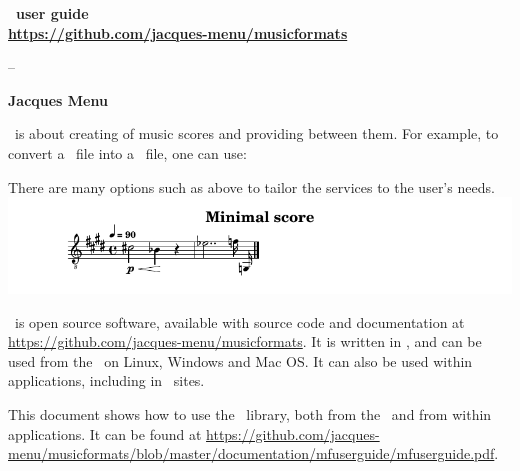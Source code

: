 \documentclass[11pt,a4paper]{report}
\begin{document}
\begin{titlepage}
  \begin{center}
    \vspace*{2cm}

    \textbf{
      \LARGE{\mf\ user guide} \\[10pt]
			\Large{\url{https://github.com/jacques-menu/musicformats}}
		}

    \vspace{0.25cm}

    \large{
			-- %
    	
		}

    \vspace{0.75cm}

    \large{\textbf{Jacques Menu}}
  \end{center}

  \vspace{1cm}


\mf\ is about creating  of music scores and providing  between them. For example, to convert a \mxml\ file into a \lily\ file, one can use:

\begin{center}
\end{center}
There are many options such as  above to tailor the services to the user's needs. \\
\includegraphics[scale=.8]{../mfgraphics/mfgraphicsMinimalScore.png}

\mf\ is open source software, available with source code and documentation at \url{https://github.com/jacques-menu/musicformats}. It is written in \CPlusplus, and can be used from the \CLI\ on Linux, Windows and Mac OS. It can also be used within applications, including in \Web\ sites.

This document shows how to use the \mf\ library, both from the \CLI\ and from within applications.
It can be found at \url{https://github.com/jacques-menu/musicformats/blob/master/documentation/mfuserguide/mfuserguide.pdf}.


\end{titlepage}
\end{document}
